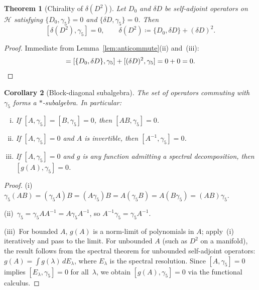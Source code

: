 \documentclass[12pt,a4paper]{article}
\newtheorem{theorem}{Theorem}[section]
\newtheorem{corollary}[theorem]{Corollary}
\theoremstyle{definition}
\theoremstyle{remark}
\newcommand{\Hilb}{\mathcal{H}}
\begin{document}
\begin{theorem}[Chirality of $\delta(D^2)$]\label{thm:chirality_deltaD2}
Let $D_0$ and $\delta D$ be self-adjoint operators on $\Hilb$ satisfying
$\{D_0, \gamma_5\} = 0$ and $\{\delta D, \gamma_5\} = 0$.  Then
\begin{equation}\label{eq:main_identity}
  [\delta(D^2), \gamma_5] = 0, \qquad
  \delta(D^2) \coloneqq \{D_0, \delta D\} + (\delta D)^2.
\end{equation}
\end{theorem}

\begin{proof}
Immediate from Lemma~\ref{lem:anticommute}(ii) and~(iii):
\begin{equation}
  [\delta(D^2), \gamma_5]
  = [\{D_0, \delta D\}, \gamma_5] + [(\delta D)^2, \gamma_5]
  = 0 + 0 = 0. \qedhere
\end{equation}
\end{proof}

\begin{corollary}[Block-diagonal subalgebra]\label{cor:subalgebra}
The set of operators commuting with $\gamma_5$ forms a $*$-subalgebra.
In particular:
\begin{enumerate}[(i)]
  \item If $[A, \gamma_5] = [B, \gamma_5] = 0$, then $[AB, \gamma_5] = 0$.
  \item If $[A, \gamma_5] = 0$ and $A$ is invertible, then
        $[A^{-1}, \gamma_5] = 0$.
  \item If $[A, \gamma_5] = 0$ and $g$ is any function admitting a
        spectral decomposition, then $[g(A), \gamma_5] = 0$.
\end{enumerate}
\end{corollary}

\begin{proof}
(i)~$\gamma_5(AB) = (\gamma_5 A)B = (A\gamma_5)B = A(\gamma_5 B) = A(B\gamma_5) = (AB)\gamma_5$.

(ii)~$\gamma_5 = \gamma_5 AA^{-1} = A\gamma_5 A^{-1}$, so
$A^{-1}\gamma_5 = \gamma_5 A^{-1}$.

(iii)~For bounded $A$, $g(A)$ is a norm-limit of polynomials in $A$; apply~(i)
iteratively and pass to the limit.  For unbounded $A$ (such as $D^2$ on a
manifold), the result follows from the spectral theorem for unbounded
self-adjoint operators: $g(A) = \int g(\lambda)\,dE_\lambda$, where $E_\lambda$
is the spectral resolution.  Since $[A, \gamma_5] = 0$ implies
$[E_\lambda, \gamma_5] = 0$ for all~$\lambda$, we obtain
$[g(A), \gamma_5] = 0$ via the functional calculus.
\end{proof}
\end{document}
